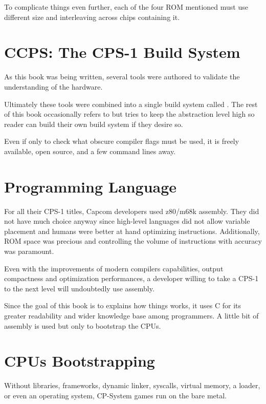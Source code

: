 To complicate things even further, each of the four ROM mentioned must use different  size and interleaving across chips containing it.

\section{CCPS: The CPS-1 Build System}
As this book was being written, several tools were authored to validate the understanding of the hardware.

Ultimately these tools were combined into a single build system called . The rest of this book occasionally refers to  but tries to keep the abstraction level high so reader can build their own build system if they desire so. 

Even if only to check what obscure compiler flags must be used, it is freely available, open source, and a few command lines away.






\section{Programming Language}
For all their CPS-1 titles, Capcom developers used z80/m68k assembly. They did not have much choice anyway since high-level languages did not allow variable placement and humans were better at hand optimizing instructions. Additionally, ROM space was precious and controlling the volume of instructions with accuracy was paramount.

Even with the improvements of modern compilers capabilities, output compactness and optimization performances, a developer willing to take a CPS-1 to the next level will undoubtedly use assembly.

Since the goal of this book is to explains how things works, it uses C for its greater readability and wider knowledge base among programmers. A little bit of assembly is used but only to bootstrap the CPUs.
	
\section{CPUs Bootstrapping}
Without libraries, frameworks, dynamic linker, syscalls, virtual memory, a loader, or even an operating system, CP-System games run on the bare metal. 

